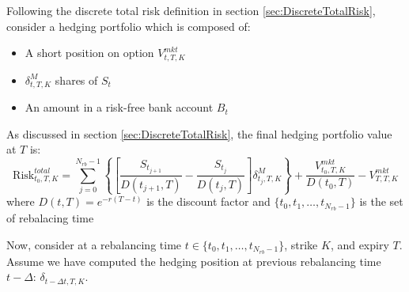\documentclass[letterpaper,12pt,titlepage,oneside,final]{book}
\numberwithin{equation}{section}
\theoremstyle{definition}
\newcommand{\DT}{\Delta t}
\newcommand{\Vmkt}{V^{mkt}}
\newcommand{\Smkt}{S}
\begin{document}
Following the discrete total risk definition in section \ref{sec:DiscreteTotalRisk}, consider a hedging portfolio  which is composed of:
\begin{itemize}
	\item A short position on option $\Vmkt_{t,T,K}$
	\item $\delta^{M}_{t,T,K}$ shares of $\Smkt_t$ 
	\item An amount in a risk-free bank account $B_t$
\end{itemize}
 As discussed in section \ref{sec:DiscreteTotalRisk}, the final hedging portfolio value at $T$ is:
 \begin{equation}
	\text{Risk}^{total}_{t_0,T,K}=\sum_{j=0}^{N_{rb}-1}\left\{ \left[\frac{\Smkt_{t_{j+1}}}{D(t_{j+1},T)}-\frac{\Smkt_{t_{j}}}{D(t_{j},T)}\right] \delta^M_{t_j,T,K} \right\}+\frac{\Vmkt_{t_0,T,K}}{D(t_{0},T)}-\Vmkt_{T,T,K}
\end{equation}
where
$D(t,T)=e^{-r(T-t)}$ is the discount factor and $\{t_0,t_1, \dots, t_{N_{rb}-1}\}$ is the set of rebalacing time

Now, consider at a  rebalancing time $t \in \{t_0,t_1, \dots, t_{N_{rb}-1}\}$, strike $K$, and expiry $T$. Assume we have computed the hedging position at previous rebalancing time $t-\Delta$: $\delta_{t-\Delta t, T,K}$. 
\end{document}
